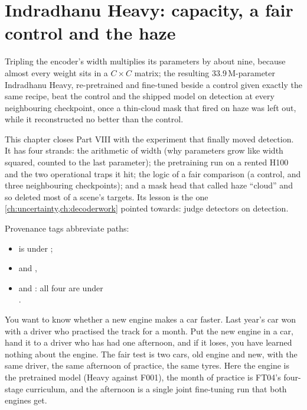 \chapter{Indradhanu Heavy: capacity, a fair control and the haze}\label{ch:heavy}

\begin{onething}
Tripling the encoder's width multiplies its parameters by about nine, because almost every weight sits in a
$C\times C$ matrix; the resulting 33.9\,M-parameter Indradhanu Heavy, re-pretrained and fine-tuned beside a
control given exactly the same recipe, beat the control and the shipped model on detection at every
neighbouring checkpoint, once a thin-cloud mask that fired on haze was left out, while it reconstructed
no better than the control.
\end{onething}

This chapter closes Part VIII with the experiment that finally moved detection. It has four strands: the
arithmetic of width (why parameters grow like width squared, counted to the last parameter); the pretraining run
on a rented H100 and the two operational traps it hit; the logic of a fair comparison (a control, and three
neighbouring checkpoints); and a mask head that called haze ``cloud'' and so deleted most of a scene's targets.
Its lesson is the one \cref{ch:uncertainty,ch:decoderwork} pointed towards: judge detectors on detection.

Provenance tags abbreviate paths:
\begin{itemize}
\item {} is under ;
\item {} and ,
\item {} and :
  all four are under\\ .
\end{itemize}

\begin{analogy}
You want to know whether a new engine makes a car faster. Last year's car won with a driver who practised the
track for a month. Put the new engine in a car, hand it to a driver who has had one afternoon, and if it loses,
you have learned nothing about the engine. The fair test is two cars, old engine and new, with the same driver,
the same afternoon of practice, the same tyres. Here the engine is the pretrained model (Heavy against F001),
the month of practice is FT04's four-stage curriculum, and the afternoon is a single joint fine-tuning run that
both engines get.
\end{analogy}

